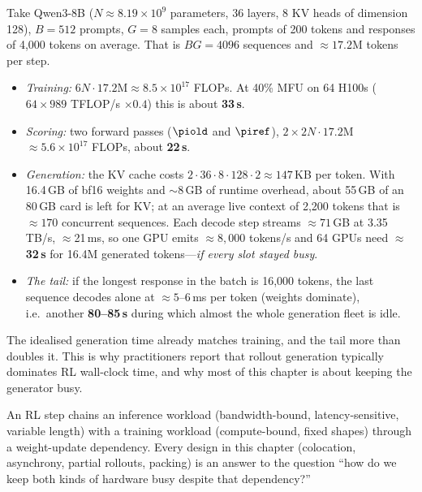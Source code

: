\begin{napkinmath}
Take Qwen3-8B ($N\approx 8.19\times10^9$ parameters, 36 layers, 8 KV heads of dimension 128),
$B=512$ prompts, $G=8$ samples each, prompts of 200 tokens and responses of 4{,}000 tokens on
average. That is $BG = 4096$ sequences and $\approx 17.2$M tokens per step.
\begin{itemize}
\item \emph{Training:} $6N\cdot 17.2\text{M} \approx 8.5\times10^{17}$ FLOPs. At 40\% MFU on 64
H100s ($64 \times 989$ TFLOP/s $\times 0.4$) this is about \textbf{33\,s}.
\item \emph{Scoring:} two forward passes ($\piold$ and $\piref$), $2\times 2N\cdot 17.2$M
$\approx 5.6\times10^{17}$ FLOPs, about \textbf{22\,s}.
\item \emph{Generation:} the KV cache costs $2\cdot 36\cdot 8\cdot 128\cdot 2 \approx 147$\,KB per
token. With 16.4\,GB of bf16 weights and $\sim$8\,GB of runtime overhead, about 55\,GB of an
80\,GB card is left for KV; at an average live context of 2{,}200 tokens that is $\approx 170$
concurrent sequences. Each decode step streams $\approx 71$\,GB at 3.35\,TB/s, $\approx$21\,ms,
so one GPU emits $\approx 8{,}000$ tokens/s and 64 GPUs need $\approx$\textbf{32\,s} for 16.4M
generated tokens---\emph{if every slot stayed busy}.
\item \emph{The tail:} if the longest response in the batch is 16{,}000 tokens, the last
sequence decodes alone at $\approx 5$--6\,ms per token (weights dominate), i.e.\ another
\textbf{80--85\,s} during which almost the whole generation fleet is idle.
\end{itemize}
The idealised generation time already matches training, and the tail more than doubles it.
This is why practitioners report that rollout generation typically dominates RL wall-clock
time, and why most of this chapter is about keeping the generator busy.
\end{napkinmath}

\begin{keyidea}
An RL step chains an inference workload (bandwidth-bound, latency-sensitive, variable length)
with a training workload (compute-bound, fixed shapes) through a weight-update dependency.
Every design in this chapter (colocation, asynchrony, partial rollouts, packing) is an
answer to the question ``how do we keep both kinds of hardware busy despite that dependency?''
\end{keyidea}

